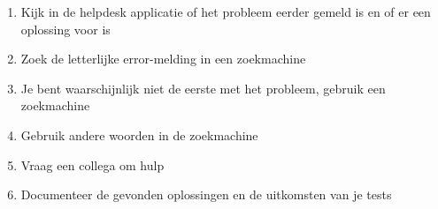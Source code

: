\begin{enumerate}
\item Kijk in de helpdesk applicatie of het probleem eerder gemeld is en of er een oplossing voor is
\item Zoek de letterlijke error-melding in een zoekmachine
\item Je bent waarschijnlijk niet de eerste met het probleem, gebruik een zoekmachine
\item Gebruik andere woorden in de zoekmachine
\item Vraag een collega om hulp
\item Documenteer de gevonden oplossingen en de uitkomsten van je tests
\end{enumerate}

